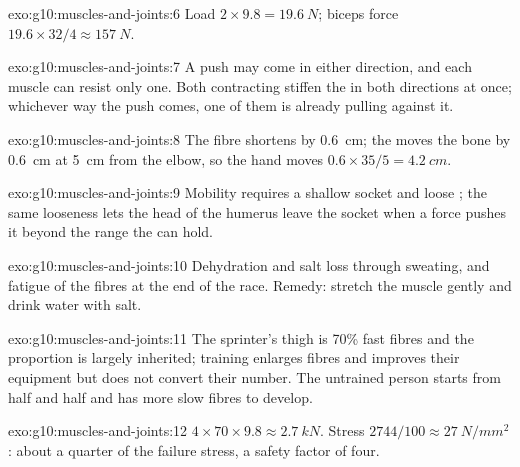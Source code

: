 \begin{solution}{exo:g10:muscles-and-joints:6}
Load $2 \times 9.8 = \qty{19.6}{N}$; biceps force $19.6 \times 32/4
\approx \qty{157}{N}$.
\end{solution}

\begin{solution}{exo:g10:muscles-and-joints:7}
A push may come in either direction, and each muscle can resist only
one. Both contracting stiffen the  in both directions at once;
whichever way the push comes, one of them is already pulling against
it.
\end{solution}

\begin{solution}{exo:g10:muscles-and-joints:8}
The fibre shortens by \qty{0.6}{cm}; the  moves the bone by
\qty{0.6}{cm} at \qty{5}{cm} from the elbow, so the hand moves
$0.6 \times 35/5 = \qty{4.2}{cm}$.
\end{solution}

\begin{solution}{exo:g10:muscles-and-joints:9}
Mobility requires a shallow socket and loose ; the same
looseness lets the head of the humerus leave the socket when a force
pushes it beyond the range the  can hold.
\end{solution}

\begin{solution}{exo:g10:muscles-and-joints:10}
Dehydration and salt loss through sweating, and fatigue of the fibres
at the end of the race. Remedy: stretch the muscle gently and drink
water with salt.
\end{solution}

\begin{solution}{exo:g10:muscles-and-joints:11}
The sprinter's thigh is 70\% fast fibres and the proportion is largely
inherited; training enlarges fibres and improves their equipment but
does not convert their number. The untrained person starts from half
and half and has more slow fibres to develop.
\end{solution}

\begin{solution}{exo:g10:muscles-and-joints:12}
$4 \times 70 \times 9.8 \approx \qty{2.7}{kN}$. Stress $2744/100
\approx \qty{27}{N/mm^2}$: about a quarter of the failure stress, a
safety factor of four.
\end{solution}

